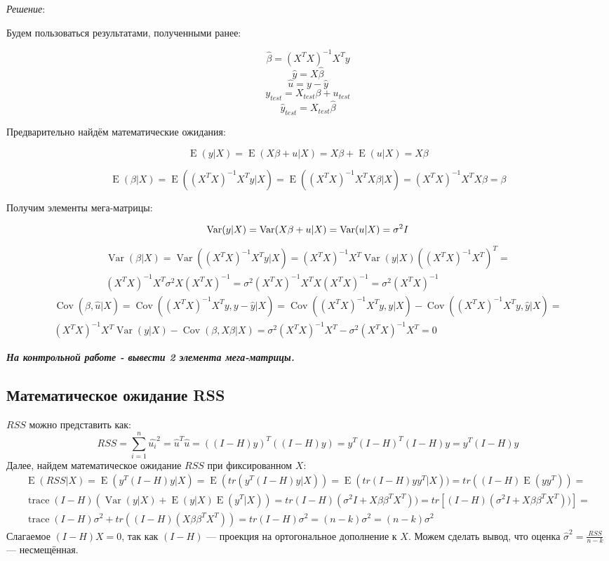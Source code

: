 \documentclass[12pt]{article} %
\theoremstyle{definition} %
\DeclareMathOperator{\Cov}{Cov}
\DeclareMathOperator{\Var}{Var}
\DeclareMathOperator{\E}{E}
\DeclareMathOperator{\tr}{trace}
\begin{document}
\textit{Решение}:

Будем пользоваться результатами, полученными ранее:

\[
 \hat\beta=(X^TX)^{-1}X^Ty
\]
\[
 \hat{y}=X\hat\beta
\]
\[
 \hat{u}=y-\hat{y}
 \]
\[
  y_{test}=X_{test}\beta+u_{test}
\]
\[
 \hat{y}_{test}=X_{test}\hat{\beta}
\]

\indent Предварительно найдём математические ожидания:

\[
\E(y|X)=\E(X\beta+u|X)=X\beta+\E(u|X)=X\beta
\]

\[
\E(\beta|X)=\E((X^TX)^{-1}X^Ty|X)=\E((X^TX)^{-1}X^TX\beta|X)=(X^TX)^{-1}X^TX\beta=\beta
\]

\indent Получим элементы мега-матрицы:

\[
\Var(y|X)=\Var(X\beta+u|X)=\Var(u|X)=\sigma^2I\\
\]
\begin{eqnarray*}
\Var(\beta|X)=\Var((X^TX)^{-1}X^Ty|X)=(X^TX)^{-1}X^T\Var(y|X)((X^TX)^{-1}X^T)^T=\\
(X^TX)^{-1}X^T\sigma^2 X(X^TX)^{-1}=\sigma^2 (X^TX)^{-1}X^TX(X^TX)^{-1}= \sigma^2 (X^TX)^{-1}
\end{eqnarray*}
\begin{eqnarray*}
\Cov(\hat{\beta},\hat{u}|X)=\Cov((X^TX)^{-1}X^Ty, y-\hat{y}|X)=
\Cov((X^TX)^{-1}X^Ty,y|X)-\Cov((X^TX)^{-1}X^Ty,\hat{y}|X)=\\
(X^TX)^{-1}X^T\Var(y|X)-\Cov(\beta,X\beta|X)
=\sigma^2(X^TX)^{-1}X^T-\sigma^2(X^TX)^{-1}X^T=0
\end{eqnarray*}

\textit{\textbf{На контрольной работе - вывести 2 элемента мега-матрицы.}}

\subsection{Математическое ожидание RSS}
$RSS$ можно представить как:\\
\[
RSS=\sum\limits_{i=1}^n  \hat{u_i}^2=\hat{u}^T\hat{u}=((I-H)y)^T((I-H)y)=
y^T(I-H)^T(I-H)y=y^T(I-H)y
\]
Далее, найдем математическое ожидание $RSS$ при фиксированном $X$:
\begin{eqnarray*}
\E(RSS|X)=\E(y^T(I-H)y|X)=\E(tr(y^T(I-H)y|X))=\E(tr(I-H)yy^T|X))=tr((I-H)\E(yy^T))=\\
\tr(I-H)(\Var(y|X)+\E(y|X)\E(y^T|X))=tr(I-H)(\sigma^2I+X\beta\beta^TX^T))=tr[(I-H)(\sigma^2I+X\beta\beta^TX^T))]=\\
\tr(I-H)\sigma^2+tr((I-H)(X\beta\beta^TX^T))=tr(I-H)\sigma^2=(n-k)\sigma^2=(n-k)\sigma^2
\end{eqnarray*}
Слагаемое $(I-H)X=0$, так как $(I-H)$ — проекция на ортогональное дополнение к $X$. Можем сделать вывод, что оценка $\hat{\sigma}^2=\frac{RSS}{n-k}$ — несмещённая.
\end{document}
